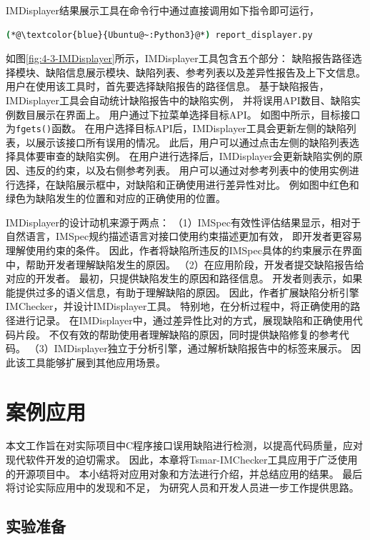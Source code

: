 IMDisplayer结果展示工具在命令行中通过直接调用如下指令即可运行，
\begin{lstlisting}[language={bash},
basicstyle=\linespread{0.8}\listingsfont,
numbers=none,
xleftmargin=.3\textwidth]
(*@\textcolor{blue}{Ubuntu@~:Python3}@*) report_displayer.py
\end{lstlisting}
如图\ref{fig:4-3-IMDisplayer}所示，IMDisplayer工具包含五个部分：
缺陷报告路径选择模块、缺陷信息展示模块、缺陷列表、参考列表以及差异性报告及上下文信息。
用户在使用该工具时，首先要选择缺陷报告的路径信息。
基于缺陷报告，IMDisplayer工具会自动统计缺陷报告中的缺陷实例，
并将误用API数目、缺陷实例数目展示在界面上。
用户通过下拉菜单选择目标API。
如图中所示，目标接口为\texttt{fgets()}函数。
在用户选择目标API后，IMDisplayer工具会更新左侧的缺陷列表，以展示该接口所有误用的情况。
此后，用户可以通过点击左侧的缺陷列表选择具体要审查的缺陷实例。
在用户进行选择后，IMDisplayer会更新缺陷实例的原因、违反的约束，以及右侧参考列表。
用户可以通过对参考列表中的使用实例进行选择，在缺陷展示框中，对缺陷和正确使用进行差异性对比。
例如图中红色和绿色为缺陷发生的位置和对应的正确使用的位置。

IMDisplayer的设计动机来源于两点：
（1）IMSpec有效性评估结果显示，相对于自然语言，IMSpec规约描述语言对接口使用约束描述更加有效，
即开发者更容易理解使用约束的条件。
因此，作者将缺陷所违反的IMSpec具体的约束展示在界面中，帮助开发者理解缺陷发生的原因。
（2）在应用阶段，开发者提交缺陷报告给对应的开发者。
最初，只提供缺陷发生的原因和路径信息。
开发者则表示，如果能提供过多的语义信息，有助于理解缺陷的原因。
因此，作者扩展缺陷分析引擎IMChecker，并设计IMDisplayer工具。
特别地，在分析过程中，将正确使用的路径进行记录。
在IMDisplayer中，通过差异性比对的方式，展现缺陷和正确使用代码片段。
不仅有效的帮助使用者理解缺陷的原因，同时提供缺陷修复的参考代码。
（3）IMDisplayer独立于分析引擎，通过解析缺陷报告中的标签来展示。
因此该工具能够扩展到其他应用场景。

\section{案例应用}
\label{sec:4.4}
本文工作旨在对实际项目中C程序接口误用缺陷进行检测，以提高代码质量，应对现代软件开发的迫切需求。
因此，本章将Tsmar-IMChecker工具应用于广泛使用的开源项目中。
本小结将对应用对象和方法进行介绍，并总结应用的结果。
最后将讨论实际应用中的发现和不足，
为研究人员和开发人员进一步工作提供思路。

\subsection{实验准备}
